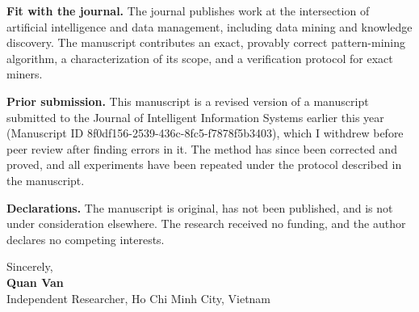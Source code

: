 \documentclass[11pt,a4paper]{article}
\begin{document}
\textbf{Fit with the journal.} The journal publishes work at the intersection of artificial intelligence and data management, including data mining and knowledge discovery. The manuscript contributes an exact, provably correct pattern-mining algorithm, a characterization of its scope, and a verification protocol for exact miners.

\textbf{Prior submission.} This manuscript is a revised version of a manuscript submitted to the Journal of Intelligent Information Systems earlier this year (Manuscript ID 8f0df156-2539-436c-8fc5-f7878f5b3403), which I withdrew before peer review after finding errors in it. The method has since been corrected and proved, and all experiments have been repeated under the protocol described in the manuscript.

\textbf{Declarations.} The manuscript is original, has not been published, and is not under consideration elsewhere. The research received no funding, and the author declares no competing interests.

Sincerely, \\[0.3em]
\textbf{Quan Van} \\
Independent Researcher, Ho Chi Minh City, Vietnam
\end{document}
